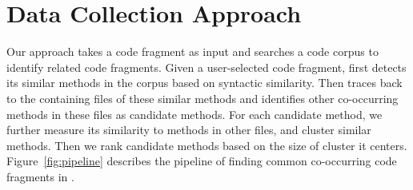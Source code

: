 \section{Data Collection Approach}
\label{sec:approach}
Our approach {\tool} takes a code fragment as input and searches a code corpus to identify related code fragments. Given a user-selected code fragment, {\tool} first detects its similar methods in the corpus based on syntactic similarity. Then {\tool} traces back to the containing files of these similar methods and identifies other co-occurring methods in these files as candidate methods. For each candidate method, we further measure its similarity to methods in other files, and cluster similar methods. Then we rank candidate methods based on the size of cluster it centers. Figure~\ref{fig:pipeline} describes the pipeline of finding common co-occurring code fragments in {\tool}. 


